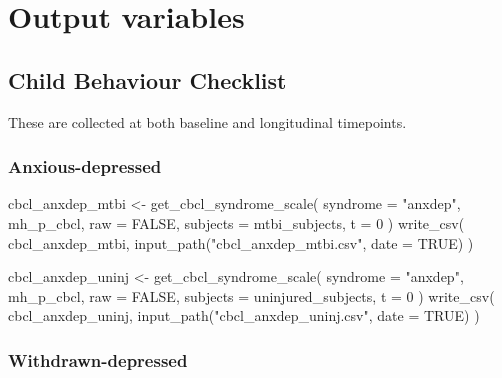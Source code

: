 \documentclass[
  letterpaper,
  DIV=11,
  numbers=noendperiod]{scrreprt}
\newenvironment{Shaded}{\begin{snugshade}}{\end{snugshade}}
\newcommand{\AttributeTok}[1]{\textcolor[rgb]{0.40,0.45,0.13}{#1}}
\newcommand{\ConstantTok}[1]{\textcolor[rgb]{0.56,0.35,0.01}{#1}}
\newcommand{\DecValTok}[1]{\textcolor[rgb]{0.68,0.00,0.00}{#1}}
\newcommand{\FunctionTok}[1]{\textcolor[rgb]{0.28,0.35,0.67}{#1}}
\newcommand{\NormalTok}[1]{\textcolor[rgb]{0.00,0.23,0.31}{#1}}
\newcommand{\OtherTok}[1]{\textcolor[rgb]{0.00,0.23,0.31}{#1}}
\newcommand{\StringTok}[1]{\textcolor[rgb]{0.13,0.47,0.30}{#1}}
\begin{document}
\section{Output variables}\label{output-variables}

\subsection{Child Behaviour Checklist}\label{child-behaviour-checklist}

These are collected at both baseline and longitudinal timepoints.

\subsubsection{Anxious-depressed}\label{anxious-depressed}

\begin{Shaded}
\begin{Highlighting}[]
\NormalTok{cbcl\_anxdep\_mtbi }\OtherTok{\textless{}{-}} \FunctionTok{get\_cbcl\_syndrome\_scale}\NormalTok{(}
    \AttributeTok{syndrome =} \StringTok{"anxdep"}\NormalTok{,}
\NormalTok{    mh\_p\_cbcl,}
    \AttributeTok{raw =} \ConstantTok{FALSE}\NormalTok{,}
    \AttributeTok{subjects =}\NormalTok{ mtbi\_subjects,}
    \AttributeTok{t =} \DecValTok{0}
\NormalTok{)}
\FunctionTok{write\_csv}\NormalTok{(}
\NormalTok{    cbcl\_anxdep\_mtbi,}
    \FunctionTok{input\_path}\NormalTok{(}\StringTok{"cbcl\_anxdep\_mtbi.csv"}\NormalTok{, }\AttributeTok{date =} \ConstantTok{TRUE}\NormalTok{)}
\NormalTok{)}

\NormalTok{cbcl\_anxdep\_uninj }\OtherTok{\textless{}{-}} \FunctionTok{get\_cbcl\_syndrome\_scale}\NormalTok{(}
    \AttributeTok{syndrome =} \StringTok{"anxdep"}\NormalTok{,}
\NormalTok{    mh\_p\_cbcl,}
    \AttributeTok{raw =} \ConstantTok{FALSE}\NormalTok{,}
    \AttributeTok{subjects =}\NormalTok{ uninjured\_subjects,}
    \AttributeTok{t =} \DecValTok{0}
\NormalTok{)}
\FunctionTok{write\_csv}\NormalTok{(}
\NormalTok{    cbcl\_anxdep\_uninj,}
    \FunctionTok{input\_path}\NormalTok{(}\StringTok{"cbcl\_anxdep\_uninj.csv"}\NormalTok{, }\AttributeTok{date =} \ConstantTok{TRUE}\NormalTok{)}
\NormalTok{)}
\end{Highlighting}
\end{Shaded}

\subsubsection{Withdrawn-depressed}\label{withdrawn-depressed}
\end{document}
